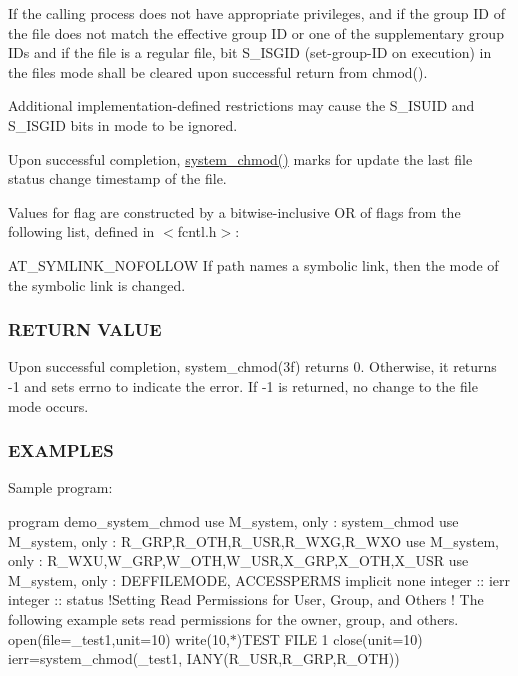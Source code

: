 If the calling process does not have appropriate privileges, and if the group ID of the file does not match the effective group ID or one of the supplementary group I\+Ds and if the file is a regular file, bit S\+\_\+\+I\+S\+G\+ID (set-\/group-\/\+ID on execution) in the file\textquotesingle{}s mode shall be cleared upon successful return from chmod().

Additional implementation-\/defined restrictions may cause the S\+\_\+\+I\+S\+U\+ID and S\+\_\+\+I\+S\+G\+ID bits in mode to be ignored.

Upon successful completion, \hyperlink{namespacem__system_ace9ce0c8a9c8341a76b8903cd2390ce3}{system\+\_\+chmod()} marks for update the last file status change timestamp of the file.

Values for flag are constructed by a bitwise-\/inclusive OR of flags from the following list, defined in $<$fcntl.\+h$>$\+:

A\+T\+\_\+\+S\+Y\+M\+L\+I\+N\+K\+\_\+\+N\+O\+F\+O\+L\+L\+OW If path names a symbolic link, then the mode of the symbolic link is changed.

\subsubsection*{R\+E\+T\+U\+RN V\+A\+L\+UE}

Upon successful completion, system\+\_\+chmod(3f) returns 0. Otherwise, it returns -\/1 and sets errno to indicate the error. If -\/1 is returned, no change to the file mode occurs.

\subsubsection*{E\+X\+A\+M\+P\+L\+ES}

Sample program\+:

program demo\+\_\+system\+\_\+chmod use M\+\_\+system, only \+: system\+\_\+chmod use M\+\_\+system, only \+: R\+\_\+\+G\+RP,R\+\_\+\+O\+TH,R\+\_\+\+U\+SR,R\+\_\+\+W\+XG,R\+\_\+\+W\+XO use M\+\_\+system, only \+: R\+\_\+\+W\+XU,W\+\_\+\+G\+RP,W\+\_\+\+O\+TH,W\+\_\+\+U\+SR,X\+\_\+\+G\+RP,X\+\_\+\+O\+TH,X\+\_\+\+U\+SR use M\+\_\+system, only \+: D\+E\+F\+F\+I\+L\+E\+M\+O\+DE, A\+C\+C\+E\+S\+S\+P\+E\+R\+MS implicit none integer \+:\+: ierr integer \+:\+: status !\+Setting Read Permissions for User, Group, and Others ! The following example sets read permissions for the owner, group, and others. open(file=\textquotesingle{}\+\_\+test1\textquotesingle{},unit=10) write(10,$\ast$)\textquotesingle{}T\+E\+ST F\+I\+LE 1\textquotesingle{} close(unit=10) ierr=system\+\_\+chmod(\textquotesingle{}\+\_\+test1\textquotesingle{}, I\+A\+N\+Y(\+R\+\_\+\+U\+S\+R,\+R\+\_\+\+G\+R\+P,\+R\+\_\+\+O\+T\+H))

